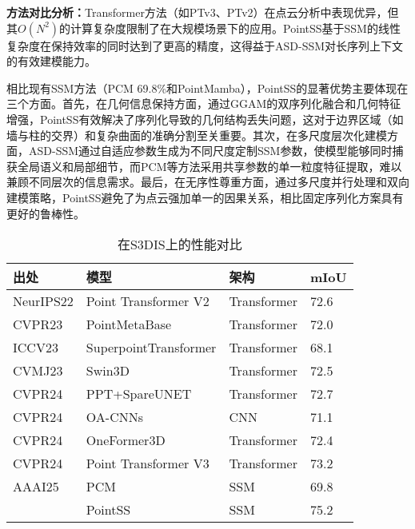 \documentclass[preprint,12pt]{elsarticle}
\begin{document}
\textbf{方法对比分析：}Transformer方法（如PTv3、PTv2）在点云分析中表现优异，但其$O(N^2)$的计算复杂度限制了在大规模场景下的应用。PointSS基于SSM的线性复杂度在保持效率的同时达到了更高的精度，这得益于ASD-SSM对长序列上下文的有效建模能力。

相比现有SSM方法（PCM 69.8\%和PointMamba），PointSS的显著优势主要体现在三个方面。首先，在几何信息保持方面，通过GGAM的双序列化融合和几何特征增强，PointSS有效解决了序列化导致的几何结构丢失问题，这对于边界区域（如墙与柱的交界）和复杂曲面的准确分割至关重要。其次，在多尺度层次化建模方面，ASD-SSM通过自适应参数生成为不同尺度定制SSM参数，使模型能够同时捕获全局语义和局部细节，而PCM等方法采用共享参数的单一粒度特征提取，难以兼顾不同层次的信息需求。最后，在无序性尊重方面，通过多尺度并行处理和双向建模策略，PointSS避免了为点云强加单一的因果关系，相比固定序列化方案具有更好的鲁棒性。
\begin{table}[htbp!]
	\caption{在S3DIS上的性能对比}
\label{tab:s3dis}
	\begin{tabular}{@{}llll@{}}
		\toprule
		\textbf{出处}  & \textbf{模型}           & \textbf{架构} & \textbf{mIoU} \\ \midrule
		NeurIPS22 & Point Transformer V2\cite{ptv2}  & Transformer & 72.6          \\
		CVPR23     & PointMetaBase\cite{pmb}         & Transformer & 72.0          \\
		ICCV23     & SuperpointTransformer\cite{spt} & Transformer & 68.1          \\
		CVMJ23     & Swin3D\cite{Swin3D}                & Transformer & 72.5          \\
		CVPR24     & PPT+SpareUNET\cite{ppt}         & Transformer & 72.7          \\
		CVPR24     & OA-CNNs\cite{oacnn}               & CNN         & 71.1          \\
		CVPR24     & OneFormer3D\cite{OneFormer3D}           & Transformer & 72.4          \\
		CVPR24     & Point Transformer V3\cite{ptv3}           & Transformer & 73.2          \\
		AAAI25    & PCM\cite{pcm}                   & SSM         & 69.8         \\
		& PointSS               &SSM           & 75.2          \\ \bottomrule
	\end{tabular}
		\centering
	

\end{table}
\end{document}
